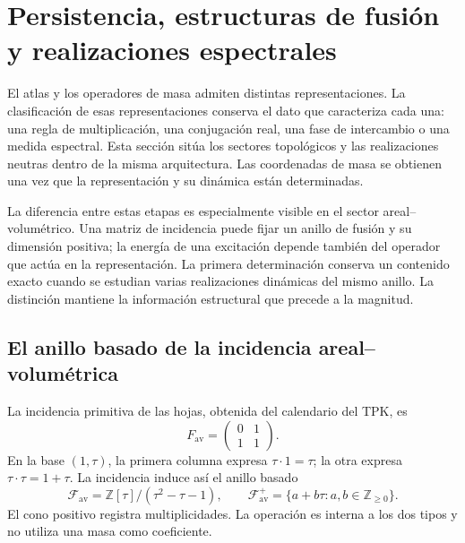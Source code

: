 \section{Persistencia, estructuras de fusión y realizaciones espectrales}
\label{vi:vi:sec:topologia}

El atlas y los operadores de masa admiten distintas representaciones. La
clasificación de esas representaciones conserva el dato que caracteriza
cada una: una regla de multiplicación, una conjugación real, una fase de
intercambio o una medida espectral. Esta sección sitúa los sectores
topológicos y las realizaciones neutras dentro de la misma arquitectura.
Las coordenadas de masa se obtienen una vez que la representación y su
dinámica están determinadas.

La diferencia entre estas etapas es especialmente visible en el sector
areal--volumétrico. Una matriz de incidencia puede fijar un anillo de fusión
y su dimensión positiva; la energía de una excitación depende también del
operador que actúa en la representación. La primera determinación conserva
un contenido exacto cuando se estudian varias realizaciones dinámicas
del mismo anillo. La distinción mantiene la información estructural que
precede a la magnitud.

\subsection{El anillo basado de la incidencia areal--volumétrica}
\label{vi:vi:subsec:fusion-av}

La incidencia primitiva de las hojas, obtenida del calendario del TPK, es
\[
 F_{\mathrm{av}}=\begin{pmatrix}0&1\\1&1\end{pmatrix}.
\]
En la base $(1,\tau)$, la primera columna expresa
$\tau\cdot1=\tau$; la otra expresa $\tau\cdot\tau=1+\tau$.
La incidencia induce así el anillo basado
\[
 \mathcal F_{\mathrm{av}}=\mathbb Z[\tau]/(\tau^2-\tau-1),
 \qquad \mathcal F_{\mathrm{av}}^+
 =\{a+b\tau:a,b\in\mathbb Z_{\geq0}\}.
\]
El cono positivo registra multiplicidades. La operación es interna a los
dos tipos y no utiliza una masa como coeficiente.


